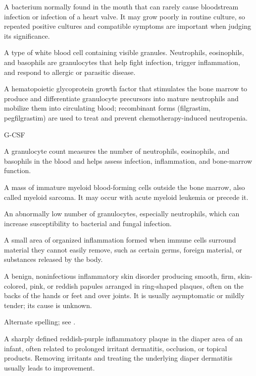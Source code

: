  A bacterium normally found in the mouth that can rarely cause bloodstream infection or infection of a heart valve. It may grow poorly in routine culture, so repeated positive cultures and compatible symptoms are important when judging its significance.

 A type of white blood cell containing visible granules. Neutrophils, eosinophils, and basophils are granulocytes that help fight infection, trigger inflammation, and respond to allergic or parasitic disease.

 A hematopoietic glycoprotein growth factor that stimulates the bone marrow to produce and differentiate granulocyte precursors into mature neutrophils and mobilize them into circulating blood; recombinant forms (filgrastim, pegfilgrastim) are used to treat and prevent chemotherapy-induced neutropenia.

\synonyms
G-CSF

 A granulocyte count measures the number of neutrophils, eosinophils, and basophils in the blood and helps assess infection, inflammation, and bone-marrow function.

 A mass of immature myeloid blood-forming cells outside the bone marrow, also called myeloid sarcoma. It may occur with acute myeloid leukemia or precede it.

 An abnormally low number of granulocytes, especially neutrophils, which can increase susceptibility to bacterial and fungal infection.

 A small area of organized inflammation formed when immune cells surround material they cannot easily remove, such as certain germs, foreign material, or substances released by the body.

 A benign, noninfectious inflammatory skin disorder producing smooth, firm, skin-colored, pink, or reddish papules arranged in ring-shaped plaques, often on the backs of the hands or feet and over joints. It is usually asymptomatic or mildly tender; its cause is unknown.

 Alternate spelling; see .

 A sharply defined reddish-purple inflammatory plaque in the diaper area of an infant, often related to prolonged irritant dermatitis, occlusion, or topical products. Removing irritants and treating the underlying diaper dermatitis usually leads to improvement.

